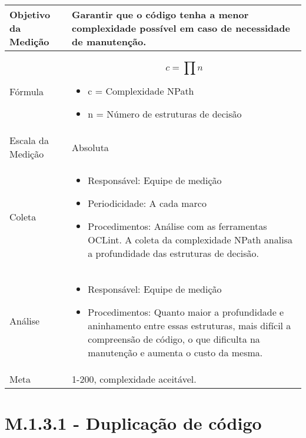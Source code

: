 	\begin{tabular}{ |p{4cm}|p{8cm}|  }
	 \hline
	 Objetivo da Medição 		& 	  Garantir que o código tenha a menor complexidade possível em caso de necessidade de manutenção. \\
	 \hline
	 Fórmula		& 		\[ c = \prod{n} \] \begin{itemize} \item c = Complexidade NPath 
	 \item n = Número de estruturas de decisão \end{itemize}\\
	 \hline
	 Escala da Medição 		& 		Absoluta \\
	 \hline
	 Coleta		& 		\begin{itemize} \item Responsável: Equipe de medição \item Periodicidade: A cada marco \item Procedimentos: Análise com as ferramentas OCLint. A coleta da complexidade NPath analisa a profundidade das estruturas de decisão. \end{itemize} \\
	 \hline
	 Análise		& 		\begin{itemize} \item Responsável: Equipe de medição \item Procedimentos: Quanto maior a profundidade e aninhamento entre essas estruturas, mais difícil a compreensão de código, o que dificulta na manutenção e aumenta o custo da mesma. \end{itemize} \\
	 \hline
	 Meta		& 	1-200, complexidade aceitável. \\
	 \hline
	\end{tabular}


\section{M.1.3.1 - Duplicação de código} 

